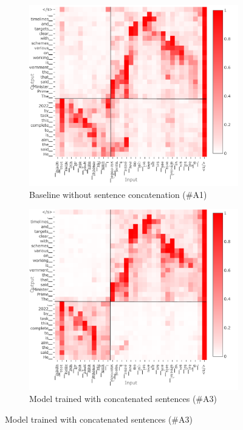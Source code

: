 \begin{figure}[h!tb]
    \centering
    \begin{subfigure}[b]{0.49\linewidth}
        \centering
        \includegraphics[width=\linewidth,trim={0mm 3mm 38mm 3mm},clip]{img/robustness/xattn-catXL-baseline-ann.pdf}
        \caption{Baseline without sentence concatenation (\#A1)}
        \label{fig:baseline-on-catXL}
     \end{subfigure}
    \begin{subfigure}[b]{0.49\linewidth}
        \centering
        \includegraphics[width=\linewidth,trim={0mm 3mm 38mm 1mm},clip]{img/robustness/xattn-catXL-catXL-ann.pdf}
        \caption{Model trained with concatenated sentences (\#A3)}
        \label{fig:CatXL-on-CatXL}
     \end{subfigure}
   

\end{figure}
